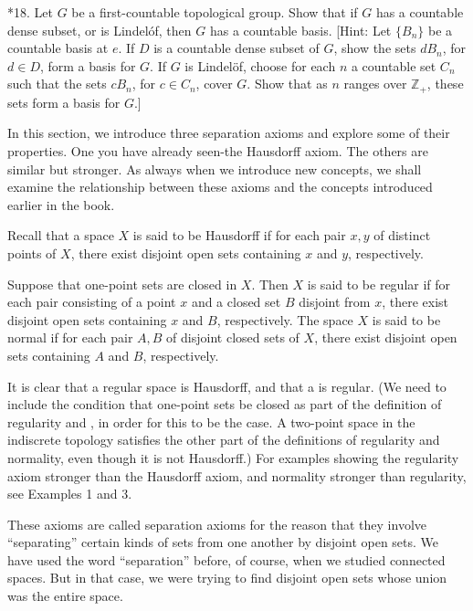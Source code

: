 *18. Let \(G\) be a first-countable topological group. Show that if \(G\) has a countable dense subset, or is Lindelóf, then \(G\) has a countable basis. [Hint: Let \(\{ B_{n}\}\) be a countable basis at \(e\). If \(D\) is a countable dense subset of \(G\), show the sets \(dB_{n}\), for \(d \in D\), form a basis for \(G\). If \(G\) is Lindelöf, choose for each \(n\) a countable set \(C_{n}\) such that the sets \(cB_{n}\), for \(c \in {C}_{n}\), cover \(G\). Show that as \(n\) ranges over \(\mathbb{Z}_{ + }\), these sets form a basis for \(G\).]


In this section, we introduce three separation axioms and explore some of their properties. One you have already seen-the Hausdorff axiom. The others are similar but stronger. As always when we introduce new concepts, we shall examine the relationship between these axioms and the concepts introduced earlier in the book.

Recall that a space \(X\) is said to be Hausdorff if for each pair \(x,y\) of distinct points of \(X\), there exist disjoint open sets containing \(x\) and \(y\), respectively.

\begin{definition}
 Suppose that one-point sets are closed in \(X\). Then \(X\) is said to be regular if for each pair consisting of a point \(x\) and a closed set \(B\) disjoint from \(x\), there exist disjoint open sets containing \(x\) and \(B\), respectively. The space \(X\) is said to be normal if for each pair \(A,B\) of disjoint closed sets of \(X\), there exist disjoint open sets containing \(A\) and \(B\), respectively.
\end{definition}

It is clear that a regular space is Hausdorff, and that a  is regular. (We need to include the condition that one-point sets be closed as part of the definition of regularity and , in order for this to be the case. A two-point space in the indiscrete topology satisfies the other part of the definitions of regularity and normality, even though it is not Hausdorff.) For examples showing the regularity axiom stronger than the Hausdorff axiom, and normality stronger than regularity, see Examples 1 and 3.

These axioms are called separation axioms for the reason that they involve ``separating'' certain kinds of sets from one another by disjoint open sets. We have used the word ``separation'' before, of course, when we studied connected spaces. But in that case, we were trying to find disjoint open sets whose union was the entire space.

